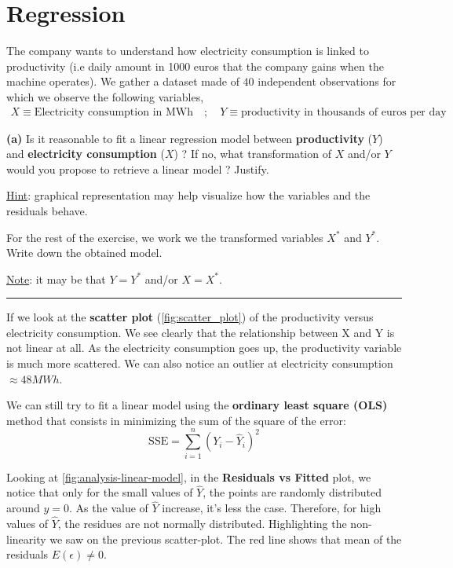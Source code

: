 \section{Regression}

The company wants to understand how electricity consumption is linked to productivity (i.e daily amount in 1000 euros that the company gains when the machine operates). We gather a dataset made of $40$ independent observations for which we observe the following variables,
\begin{equation}
  \begin{array}{rl}
    X \equiv \text{Electricity consumption in MWh} \quad ; \quad Y \equiv \text{productivity in thousands of euros per day}
  \end{array}
\end{equation}

\textbf{(a)} Is it reasonable to fit a linear regression model between \textbf{productivity} ($Y$) and \textbf{electricity consumption} ($X$) ? 
If no, what transformation of $X$ and/or $Y$ would you propose to retrieve a linear model ? Justify.

\underline{Hint}: graphical representation may help visualize how the variables and the residuals behave.

For the rest of the exercise, we work we the transformed variables $X^{\ast}$ and $Y^{\ast}$. 
Write down the obtained model.

\underline{Note}: it may be that $Y = Y^{\ast}$ and/or $X = X^{\ast}$.

\begin{center}\rule{6cm}{0.4pt}\end{center}

If we look at the \textbf{scatter plot} (\ref{fig:scatter_plot}) of the productivity versus electricity consumption. We see clearly that the relationship between X and Y is not linear at all. As the electricity consumption goes up, the productivity variable is much more scattered. We can also notice an outlier at electricity consumption $\approx 48MWh$.

We can still try to fit a linear model using the \textbf{ordinary least square (OLS)} method that consists in minimizing the sum of the square of the error: 
\begin{equation}
  \text{SSE} = \sum_{i = 1}^{n} (Y_i - \hat{Y}_i)^2
\end{equation}

Looking at \autoref{fig:analysis-linear-model}, in the \textbf{Residuals vs Fitted} plot, we notice that only for the small values of $\hat{Y}$, the points are randomly distributed around $y = 0$. As the value of $\hat{Y}$ increase, it's less the case. Therefore, for high values of $\hat{Y}$, the residues are not normally distributed. Highlighting the non-linearity we saw on the previous scatter-plot. The red line shows that mean of the residuals $E(\epsilon) \neq 0$.

